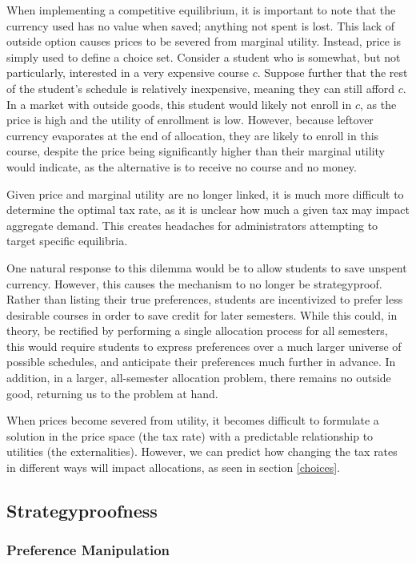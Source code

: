 \documentclass{article}
\begin{document}
When implementing a competitive equilibrium, it is important to note that the currency used has no value when saved; anything not spent is lost. This lack of outside option causes prices to be severed from marginal utility. Instead, price is simply used to define a choice set. Consider a student who is somewhat, but not particularly, interested in a very expensive course $c$. Suppose further that the rest of the student's schedule is relatively inexpensive, meaning they can still afford $c$. In a market with outside goods, this student would likely not enroll in $c$, as the price is high and the utility of enrollment is low. However, because leftover currency evaporates at the end of allocation, they are likely to enroll in this course, despite the price being significantly higher than their marginal utility would indicate, as the alternative is to receive no course and no money.

Given price and marginal utility are no longer linked, it is much more difficult to determine the optimal tax rate, as it is unclear how much a given tax may impact aggregate demand. This creates headaches for administrators attempting to target specific equilibria. 

One natural response to this dilemma would be to allow students to save unspent currency. However, this causes the mechanism to no longer be strategyproof. Rather than listing their true preferences, students are incentivized to prefer less desirable courses in order to save credit for later semesters. While this could, in theory, be rectified by performing a single allocation process for all semesters, this would require students to express preferences over a much larger universe of possible schedules, and anticipate their preferences much further in advance. In addition, in a larger, all-semester allocation problem, there remains no outside good, returning us to the problem at hand.

When prices become severed from utility, it becomes difficult to formulate a solution in the price space (the tax rate) with a predictable relationship to utilities (the externalities). However, we can predict how changing the tax rates in different ways will impact allocations, as seen in section \ref{choices}.


\subsection{Strategyproofness}

\subsubsection{Preference Manipulation}
\label{strategyproofness}
\end{document}
